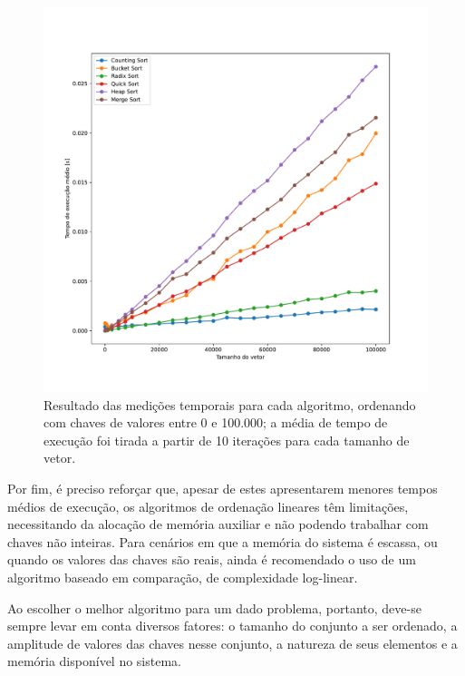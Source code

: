 \documentclass[fontsize=10pt]{article}
\begin{document}
\begin{figure}[]
\begin{center}
    \includegraphics[scale=0.4]{imagens/0201.pdf}
    \caption{Resultado das medições temporais para cada algoritmo, ordenando com chaves de valores entre 0 e 100.000; a média de tempo de execução foi tirada a partir de 10 iterações para cada tamanho de vetor.}
    \label{Figura 8}
\end{center}
\end{figure}

\newpage
\quad Por fim, é preciso reforçar que, apesar de estes apresentarem menores tempos médios de execução, os algoritmos de ordenação lineares têm limitações, necessitando da alocação de memória auxiliar e não podendo trabalhar com chaves não inteiras. Para cenários em que a memória do sistema é escassa, ou quando os valores das chaves são reais, ainda é recomendado o uso de um algoritmo baseado em comparação, de complexidade log-linear.

\quad Ao escolher o melhor algoritmo para um dado problema, portanto, deve-se sempre levar em conta diversos fatores: o tamanho do conjunto a ser ordenado, a amplitude de valores das chaves nesse conjunto, a natureza de seus elementos e a memória disponível no sistema.

\end{document}
